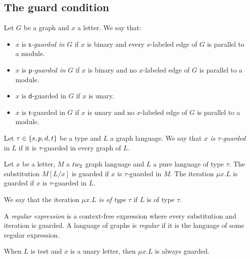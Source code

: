 \subsection{The guard condition}

\begin{definition}
Let $G$ be a graph and $x$ a letter. We say that:
\begin{itemize}
\item $x$ is \emph{$\mathsf{s}$-guarded in $G$} if $x$ is binary and every $x$-labeled edge of $G$ is parallel to a module.
\item $x$ is \emph{$\mathsf{p}$-guarded in $G$} if $x$ is binary and no $x$-labeled edge of $G$ is parallel to a module.
\item $x$ is $\mathsf{d}$-guarded in $G$ if $x$ is unary.
\item $x$ is $\mathsf{t}$-guarded in $G$ if $x$ is unary and no $x$-labeled edge of $G$ is parallel to a module.
\end{itemize} 
Let $\tau\in\set{\mathsf{s}, \mathsf{p}, \mathsf{d}, \mathsf{t}}$ be a type and $L$ a graph language. We say that \emph{$x$ is $\tau$-guarded} in $L$ if it is $\tau$-guarded in every graph of $L$.
\end{definition}
\begin{definition} Let $x$ be a letter, $M$ a $\TWT$ graph language and $L$ a pure language of type $\tau$.
The substitution $M[L/x]$ is guarded if $x$ is $\tau$-guarded in $M$.
The iteration $\mu x. L$ is guarded if $x$ is $\tau$-guarded in $L$.

We say that the iteration \emph{$\mu x. L$ is of type $\tau$} if $L$ is of type $\tau$.
\end{definition}


\begin{definition}
A \emph{regular expression} is a context-free expression where every substitution and iteration is guarded. A language of graphs is \emph{regular} if it is the language of some regular expression. 
\end{definition}
\begin{remark}
When $L$ is test and $x$ is a unary letter, then $\mu x. L$ is always guarded. 
\end{remark}
 

%


